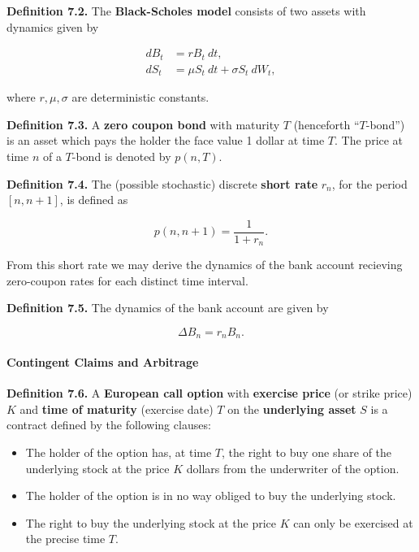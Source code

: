 \documentclass[
]{article}
\providecommand{\tightlist}{%
  \setlength{\itemsep}{0pt}\setlength{\parskip}{0pt}}
\begin{document}
\textbf{Definition 7.2.} The \textbf{Black-Scholes model} consists of
two assets with dynamics given by

\begin{align*}
dB_t&=rB_t\ dt,\\
dS_t&=\mu S_t\ dt+\sigma S_t\ dW_t,
\end{align*}

where \(r,\mu,\sigma\) are deterministic constants.

\textbf{Definition 7.3.} A \textbf{zero coupon bond} with maturity \(T\)
(henceforth ``\(T\)-bond'') is an asset which pays the holder the face
value 1 dollar at time \(T\). The price at time \(n\) of a \(T\)-bond is
denoted by \(p(n,T)\).

\textbf{Definition 7.4.} The (possible stochastic) discrete
\textbf{short rate} \(r_n\), for the period \([n,n+1]\), is defined as

\[
p(n,n+1)=\frac{1}{1+ r_n}.
\]

From this short rate we may derive the dynamics of the bank account
recieving zero-coupon rates for each distinct time interval.

\textbf{Definition 7.5.} The dynamics of the bank account are given by

\[
\Delta B_n=r_n B_n.
\]

\hypertarget{contingent-claims-and-arbitrage}{%
\paragraph{Contingent Claims and
Arbitrage}\label{contingent-claims-and-arbitrage}}

\textbf{Definition 7.6.} A \textbf{European call option} with
\textbf{exercise price} (or strike price) \(K\) and \textbf{time of
maturity} (exercise date) \(T\) on the \textbf{underlying asset} \(S\)
is a contract defined by the following clauses:

\begin{itemize}
\tightlist
\item
  The holder of the option has, at time \(T\), the right to buy one
  share of the underlying stock at the price \(K\) dollars from the
  underwriter of the option.
\item
  The holder of the option is in no way obliged to buy the underlying
  stock.
\item
  The right to buy the underlying stock at the price \(K\) can only be
  exercised at the precise time \(T\).
\end{itemize}
\end{document}
